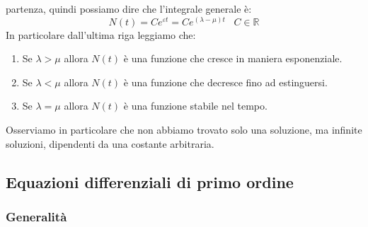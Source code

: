 \documentclass[a4paper]{article}
\numberwithin{equation}{subsection}
\begin{document}
partenza, quindi possiamo dire che l'integrale generale è:
\[N(t) = Ce^{\varepsilon t} = Ce^{(\lambda - \mu)t} \; \; \; C \in \mathbb{R}\]
In particolare dall'ultima riga leggiamo che:
\begin{enumerate}
    \item Se $\lambda > \mu$ allora $N(t)$ è una funzione che cresce in maniera esponenziale.
    \item Se $\lambda < \mu$ allora $N(t)$ è una funzione che decresce fino ad estinguersi. 
    \item Se $\lambda = \mu$ allora $N(t)$ è una funzione stabile nel tempo.
\end{enumerate}
Osserviamo in particolare che non abbiamo trovato solo una soluzione, ma infinite soluzioni,
dipendenti da una costante arbitraria.

\subsection{Equazioni differenziali di primo ordine}

\subsubsection{Generalità}
\end{document}
